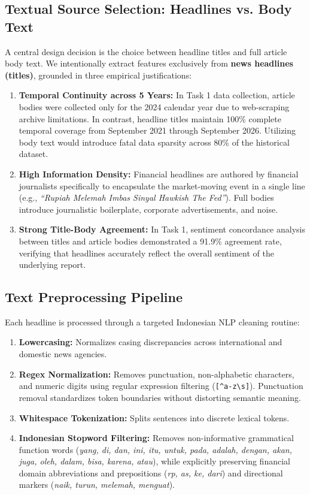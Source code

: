 \documentclass[10pt,a4paper]{article}
\begin{document}
\subsection{Textual Source Selection: Headlines vs. Body Text}
A central design decision is the choice between headline titles and full article body text. We intentionally extract features exclusively from \textbf{news headlines (titles)}, grounded in three empirical justifications:
\begin{enumerate}[leftmargin=1.5em]
    \item \textbf{Temporal Continuity across 5 Years:} In Task 1 data collection, article bodies were collected only for the 2024 calendar year due to web-scraping archive limitations. In contrast, headline titles maintain 100\% complete temporal coverage from September 2021 through September 2026. Utilizing body text would introduce fatal data sparsity across 80\% of the historical dataset.
    \item \textbf{High Information Density:} Financial headlines are authored by financial journalists specifically to encapsulate the market-moving event in a single line (e.g., \textit{``Rupiah Melemah Imbas Sinyal Hawkish The Fed''}). Full bodies introduce journalistic boilerplate, corporate advertisements, and noise.
    \item \textbf{Strong Title-Body Agreement:} In Task 1, sentiment concordance analysis between titles and article bodies demonstrated a 91.9\% agreement rate, verifying that headlines accurately reflect the overall sentiment of the underlying report.
\end{enumerate}

\subsection{Text Preprocessing Pipeline}
Each headline is processed through a targeted Indonesian NLP cleaning routine:
\begin{enumerate}[leftmargin=1.5em]
    \item \textbf{Lowercasing:} Normalizes casing discrepancies across international and domestic news agencies.
    \item \textbf{Regex Normalization:} Removes punctuation, non-alphabetic characters, and numeric digits using regular expression filtering (\verb|[^a-z\s]|). Punctuation removal standardizes token boundaries without distorting semantic meaning.
    \item \textbf{Whitespace Tokenization:} Splits sentences into discrete lexical tokens.
    \item \textbf{Indonesian Stopword Filtering:} Removes non-informative grammatical function words (\textit{yang, di, dan, ini, itu, untuk, pada, adalah, dengan, akan, juga, oleh, dalam, bisa, karena, atau}), while explicitly preserving financial domain abbreviations and prepositions (\textit{rp, as, ke, dari}) and directional markers (\textit{naik, turun, melemah, menguat}).
\end{enumerate}
\end{document}
